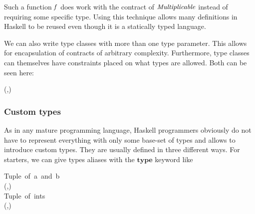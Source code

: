 \documentclass[paper=A4,twoside=true,openright,parskip=full,chapterprefix=true,headings=normal,bibliography=totoc,listof=totoc,titlepage=on,captions=tableabove,draft=false,british]{scrreprt}%
\begin{document}
Such a function \ensuremath{\Varid{f}} does work with the contract of \ensuremath{\Conid{Multiplicable}}
instead of requiring some specific type. Using this technique allows
many definitions in Haskell to be reused even though it is a statically
typed language.

We can also write type classes with more than one type parameter. This
allows for encapsulation of contracts of arbitrary complexity.
Furthermore, type classes can themselves have constraints placed on what
types are allowed. Both can be seen here:


\begin{hscode}\SaveRestoreHook
{}%
%
%
%
\>[B]{}\;(\;,\;)\Rightarrow {}\;\;\;\;\<[E]%
\\
\>[B]{}\<[5]%
\>[5]{}\<[5E]%
\ColumnHook
\end{hscode}\resethooks
\vspace{-2\baselineskip}

\hypertarget{custom-types}{%
\subsubsection{Custom types}\label{custom-types}}

As in any mature programming language, Haskell programmers obviously do
not have to represent everything with only some base-set of types and
allows to introduce custom types. They are usually defined in three
different ways. For starters, we can give types aliases with the \ensuremath{\mathbf{type}}
keyword like


\begin{hscode}\SaveRestoreHook
{}%
%
\>[B]{}\mbox{\onelinecomment  Tuple of a and b}{}\<[E]%
\\
\>[B]{}\;\;\;\mathrel{=}(,){}\<[E]%
\\[\blanklineskip]%
\>[B]{}\mbox{\onelinecomment  Tuple of ints}{}\<[E]%
\\
\>[B]{}\;\mathrel{=}(,){}\<[E]%
\ColumnHook
\end{hscode}\resethooks
\vspace{-2\baselineskip}
\end{document}
